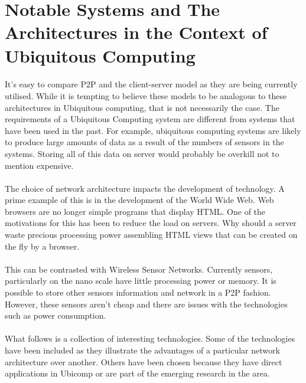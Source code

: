 \documentclass[11pt]{amsart}
\begin{document}

\section{Notable Systems and The Architectures in the Context of Ubiquitous Computing}
\paragraph{}
It's easy to compare P2P and the client-server model as they are being currently utilised. While it is tempting to believe these models to be analogous to these architectures in Ubiquitous computing, that is not necessarily the case. The requirements of a Ubiquitous Computing system are different from systems that have been used in the past. For example, ubiquitous computing systems are likely to produce large amounts of data as a result of the numbers of sensors in the systems. Storing all of this data on server would probably be overkill not to mention expensive.
\paragraph{}
The choice of network architecture impacts the development of technology. A prime example of this is in the development of the World Wide Web. Web browsers are no longer simple programs that display HTML. One of the motivations for this has been to reduce the load on servers. Why should a server waste precious processing power assembling HTML views that can be created on the fly by a browser.
\paragraph{}
This can be contrasted with Wireless Sensor Networks. Currently sensors, particularly on the nano scale have little processing power or memory. It is possible to store other sensors information and network in a P2P fashion. However, these sensors aren't cheap and there are issues with the technologies such as power consumption.
\paragraph{}
What follows is a collection of interesting technologies. Some of the technologies have been included as they illustrate the advantages of a particular network architecture over another. Others have been chosen because they have direct applications in Ubicomp or are part of the emerging research in the area.
\end{document}
